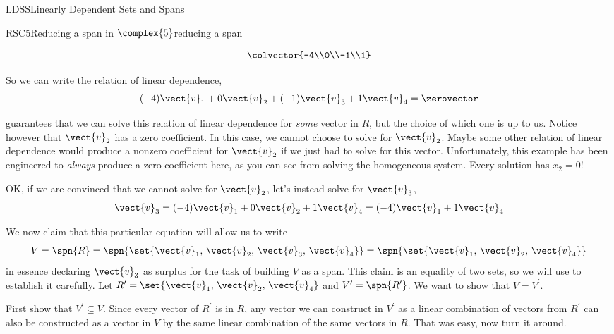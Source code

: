 \begin{subsect}{LDSS}{Linearly Dependent Sets and Spans}
\begin{example}{RSC5}{Reducing a span in $\complex{5}$}{reducing a span}
\begin{para}
%
\begin{equation*}
\colvector{-4\\0\\-1\\1}
\end{equation*}
\end{para}
%
\begin{para}So we can write the relation of linear dependence,
%
\begin{equation*}
(-4)\vect{v}_1+0\vect{v}_2+(-1)\vect{v}_3+1\vect{v}_4=\zerovector
\end{equation*}
\end{para}
%
\begin{para} guarantees that we can solve this relation of linear dependence for {\em some} vector in $R$, but the choice of which one is up to us.  Notice however that $\vect{v}_2$ has a zero coefficient.  In this case, we cannot choose to solve for $\vect{v}_2$.  Maybe some other relation of linear dependence would produce a nonzero coefficient for $\vect{v}_2$ if we just had to solve for this vector.  Unfortunately, this example has been engineered to {\em always} produce a zero coefficient here, as you can see from solving the homogeneous system.  Every solution has $x_2=0$!\end{para}
%
\begin{para}OK, if we are convinced that we cannot solve for $\vect{v}_2$, let's instead solve for $\vect{v}_3$,
%
\begin{equation*}
\vect{v}_3=(-4)\vect{v}_1+0\vect{v}_2+1\vect{v}_4=(-4)\vect{v}_1+1\vect{v}_4
\end{equation*}
\end{para}
%
\begin{para}We now claim that this particular equation will allow us to write
%
\begin{equation*}
V=\spn{R}=
\spn{\set{\vect{v}_1,\,\vect{v}_2,\,\vect{v}_3,\,\vect{v}_4}}=
\spn{\set{\vect{v}_1,\,\vect{v}_2,\,\vect{v}_4}}
\end{equation*}
%
in essence declaring $\vect{v}_3$ as surplus for the task of building $V$ as a span.  This claim is an equality of two sets, so we will use  to establish it carefully.  Let $R^\prime=\set{\vect{v}_1,\,\vect{v}_2,\,\vect{v}_4}$ and $V^\prime=\spn{R^\prime}$.  We want to show that $V=V^\prime$.\end{para}
%
\begin{para}First show that $V^\prime\subseteq V$.  Since every vector of $R^\prime$ is in $R$, any vector we can construct in $V^\prime$ as a linear combination of vectors from $R^\prime$ can also be constructed as a vector in $V$ by the same linear combination of the same vectors in $R$.  That was easy, now turn it around.\end{para}

\end{example}
\end{subsect}
